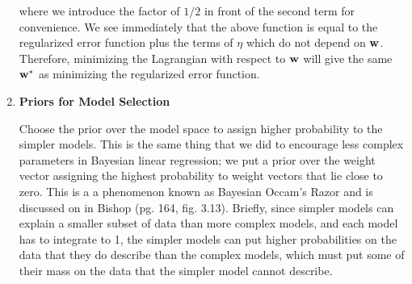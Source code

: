\documentclass[12pt,letterpaper]{article}
\begin{document}
\begin{enumerate}
where we introduce the factor of $1/2$ in front of the second term for convenience. We see immediately that the above function is equal to the regularized error function plus the terms of $\eta$ which do not depend on $\mathbf{w}$. Therefore, minimizing the Lagrangian with respect to $\mathbf{w}$ will give the same $\mathbf{w}^*$ as minimizing the regularized error function. 

\newpage

\item {\bf Priors for Model Selection }\\

\vspace{\baselineskip}


Choose the prior over the model space to assign higher probability to the simpler models. This is the same thing that we did to encourage less complex parameters in Bayesian linear regression; we put a prior over the weight vector assigning the highest probability to weight vectors that lie close to zero. This is a a phenomenon known as Bayesian Occam's Razor and is discussed on in Bishop (pg. 164, fig. 3.13). Briefly, since simpler models can explain a smaller subset of data than more complex models, and each model has to integrate to 1, the simpler models can put higher probabilities on the data that they do describe than the complex models, which must put some of their mass on the data that the simpler model cannot describe. 

\end{enumerate}
\end{document}
